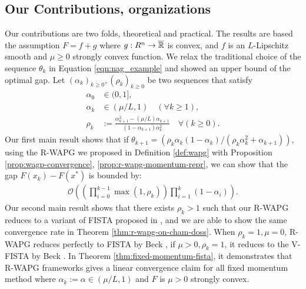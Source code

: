 \documentclass[12pt]{article}
\begin{document}
    \subsection{Our Contributions, organizations}
        Our contributions are two folds, theoretical and practical. 
        The results are based the assumption $F = f + g$ where $g:R^n \rightarrow \overline{\mathbb R}$ is convex, and $f$ is an $L$-Lipschitz smooth and $\mu \ge 0$ strongly convex function. 
        We relax the traditional choice of the sequence $\theta_k$ in Equation \ref{eqn:nag_example} and showed an upper bound of the optimal gap. 
        Let $(\alpha_k)_{k \ge0}, (\rho_k)_{k \ge 0}$ be two sequences that satisfy
        \begin{align*}
            \alpha_0 &\in (0, 1], 
            \\
            \alpha_k &\in (\mu/L, 1) \quad (\forall k \ge 1), 
            \\
            \rho_k &:= \frac{\alpha_{k + 1}^2 - (\mu/L)\alpha_{k + 1}}{(1 - \alpha_{k + 1})\alpha_k^2} \quad \forall (k \ge 0). 
        \end{align*}
        Our first main result shows that if $\theta_{k + 1} = (\rho_k\alpha_k(1 - \alpha_k)/(\rho_k\alpha_k^2 + \alpha_{k + 1}))$, using the R-WAPG we proposed in Definition \ref{def:wapg} with Proposition \ref{prop:wagp-convergence}, \ref{prop:r-wapg-momentum-repr}, we can show that the gap $F(x_k) - F(x^*)$ is bounded by:
        \begin{align*}
            \mathcal O\left(
                \left(
                    \prod_{i = 0}^{k - 1} \max(1, \rho_{k})
                \right)
                \prod_{i = 1}^{k} \left(1  - \alpha_i\right)
            \right). 
        \end{align*}
        Our second main result shows that there exists $\rho_k > 1$ such that our R-WAPG reduces to a variant of FISTA proposed in  \cite{chambolle_convergence_2015}, and we are able to show the same convergence rate in Theorem \ref{thm:r-wapg-on-cham-doss}. 
        When $\rho_k = 1, \mu = 0$, R-WAPG reduces perfectly to FISTA by Beck \cite{beck_first-order_2017}, if $\mu > 0, \rho_k = 1$, it reduces to the V-FISTA by Beck \cite{beck_first-order_2017}. 
        In Theorem \ref{thm:fixed-momentum-fista}, it demonstrates that R-WAPG frameworks gives a linear convergence claim for all fixed momentum method where $\alpha_k := \alpha \in (\mu/L, 1)$ and  $F$ is $\mu > 0$ strongly convex. 
        \par
\end{document}
